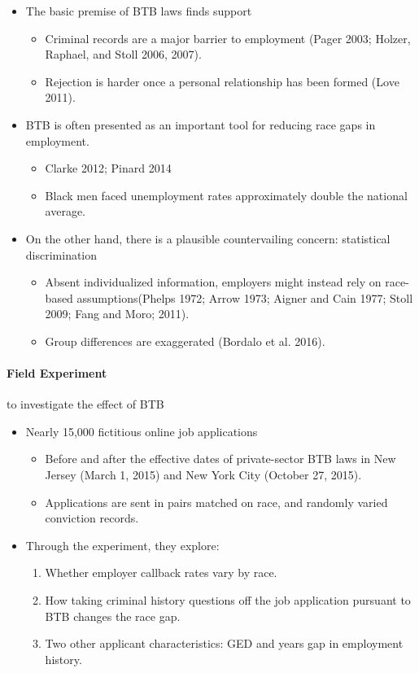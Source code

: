 \documentclass[../root]{subfiles}
\begin{document}
    \begin{itemize}
      \item The basic premise of BTB laws finds support
      \begin{itemize}
        \item Criminal records are a major barrier to employment (Pager 2003; Holzer, Raphael, and Stoll 2006, 2007).
        \item Rejection is harder once a personal relationship has been formed (Love 2011).
      \end{itemize}
      \item BTB is often presented as an important tool for reducing race gaps in employment.
      \begin{itemize}
        \item Clarke 2012; Pinard 2014
        \item Black men faced unemployment rates approximately double the national average.
      \end{itemize}
      \item On the other hand, there is a plausible countervailing concern: statistical discrimination
      \begin{itemize}
        \item Absent individualized information, employers might instead rely on race-based assumptions(Phelps 1972; Arrow 1973; Aigner and Cain 1977; Stoll 2009; Fang and Moro; 2011).
        \item Group differences are exaggerated (Bordalo et al. 2016).
      \end{itemize}
    \end{itemize}


    \paragraph{Field Experiment} to investigate the effect of BTB

    \begin{itemize}
      \item Nearly 15,000 fictitious online job applications
      \begin{itemize}
        \item Before and after the effective dates of private-sector BTB laws in New Jersey (March 1, 2015) and New York City (October 27, 2015).
        \item Applications are sent in pairs matched on race, and randomly varied conviction records.
      \end{itemize}
      \item Through the experiment, they explore:
      \begin{enumerate}
        \item Whether employer callback rates vary by race.
        \item How taking criminal history questions off the job application pursuant to BTB changes the race gap.
        \item Two other applicant characteristics: GED and years gap in employment history.
      \end{enumerate}
    \end{itemize}
\end{document}
